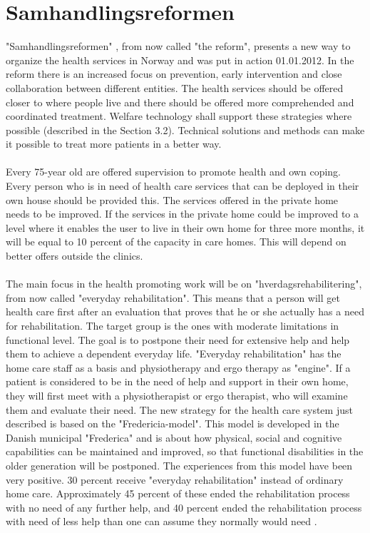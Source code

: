 \section{Samhandlingsreformen}
"Samhandlingsreformen" \cite{budsjett}\cite{regjering}, from now called "the reform", presents a new way to organize the health services in Norway and was put in action 01.01.2012. In the reform there is an increased focus on prevention, early intervention and close collaboration between different entities. The health services should be offered closer to where people live and there should be offered more comprehended and coordinated treatment. Welfare technology shall support these strategies where possible (described in the Section 3.2). Technical solutions and methods can make it possible to treat more patients in a better way. \\ \\
Every 75-year old are offered supervision to promote health and own coping. Every person who is in need of health care services that can be deployed in their own house should be provided this. The services offered in the private home needs to be improved. If the services in the private home could be improved to a level where it enables the user to live in their own home for three more months, it will be equal to 10 percent of the capacity in care homes. This will depend on better offers outside the clinics.\\ \\ The main focus in the health promoting work will be on "hverdagsrehabilitering", from now called  "everyday rehabilitation". This means that a person will get health care first after an evaluation that proves that he or she actually has a need for rehabilitation. The target group is the ones with moderate limitations in functional level. The goal is to postpone their need for extensive help and help them to achieve a dependent everyday life.  "Everyday rehabilitation" has the home care staff as a basis and physiotherapy and ergo therapy as "engine". If a patient is considered to be in the need of help and support in their own home, they will first meet with a physiotherapist or ergo therapist, who will examine them and evaluate their need. The new strategy for the health care system just described is based on the "Fredericia-model". This model is developed in the Danish municipal "Frederica" and is about how physical, social and cognitive capabilities can be maintained and improved, so that functional disabilities in the older generation will be postponed. The experiences from this model have been very positive. 30 percent receive "everyday rehabilitation" instead of ordinary home care. Approximately 45 percent of these ended the rehabilitation process with no need of any further help, and 40 percent ended the rehabilitation process with need of less help than one can assume they normally would need \cite{budsjett}\cite{regjering}.
